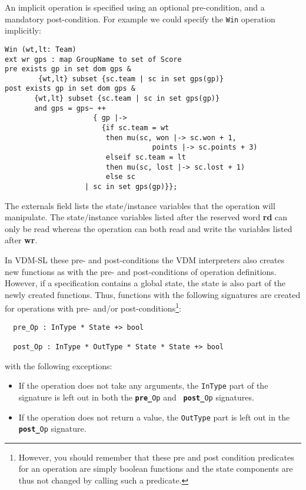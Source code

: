 \documentclass{overturerepchap}
\newcommand{\keyw}[1]{{\bf\ttfamily #1}}
\begin{document}
\begin{description}
An implicit operation is specified using an optional pre-condition,
and a mandatory post-condition. For example we could specify the
\texttt{Win} operation implicitly:
\begin{lstlisting}
Win (wt,lt: Team)
ext wr gps : map GroupName to set of Score
pre exists gp in set dom gps & 
        {wt,lt} subset {sc.team | sc in set gps(gp)}
post exists gp in set dom gps &
       {wt,lt} subset {sc.team | sc in set gps(gp)}
       and gps = gps~ ++ 
                     { gp |-> 
                       {if sc.team = wt
                        then mu(sc, won |-> sc.won + 1,
                                   points |-> sc.points + 3)
                        elseif sc.team = lt
                        then mu(sc, lost |-> sc.lost + 1)
                        else sc 
                   | sc in set gps(gp)}};
\end{lstlisting}

The externals field lists the state/instance
variables that the
operation will manipulate. The 
state/instance
variables listed after the reserved
word \keyw{rd} can only be read whereas the operation can both read and
write the variables listed after \keyw{wr}. 
 
In VDM-SL these pre- and post-conditions the VDM interpreters also
creates new functions as with the pre- and post-conditions of operation
definitions.  However, if a specification contains a global state, the
state is also part of the newly created functions. Thus, functions
with the following signatures are created for operations with pre-
and/or post-conditions\footnote{However, you should remember that
these pre and post condition predicates for an operation are simply
boolean functions and the state components are thus not changed by
calling such a predicate.}:
\begin{lstlisting}
  pre_Op : InType * State +> bool

  post_Op : InType * OutType * State * State +> bool
\end{lstlisting}
with the following exceptions:
\begin{itemize}
\item If the operation does not take any arguments, the {\tt InType} part
  of the signature is left out in both the {\tt \keyw{pre\_}Op} and {\tt
    \keyw{post\_}Op} signatures.

\item If the operation does not return a value, the {\tt OutType} part is
  left out in the {\tt \keyw{post\_}Op} signature.


\end{itemize}
\end{description}
\end{document}

